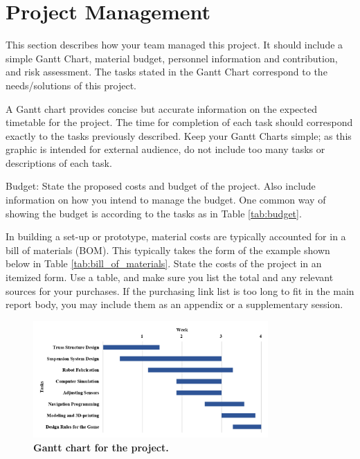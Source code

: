 \documentclass{engr1000j-s2}
\begin{document}
  \hspace{1em}

  \section{Project Management}

  This section describes how your team managed this project. It should include a
  simple Gantt Chart, material budget, personnel information and contribution,
  and risk assessment. The tasks stated in the Gantt Chart correspond to the needs/solutions
  of this project.

  A Gantt chart provides concise but accurate information on the expected timetable
  for the project. The time for completion of each task should correspond
  exactly to the tasks previously described. Keep your Gantt Charts simple; as
  this graphic is intended for external audience, do not include too many tasks or
  descriptions of each task.

  Budget: State the proposed costs and budget of the project. Also include information
  on how you intend to manage the budget. One common way of showing the budget
  is according to the tasks as in Table \ref{tab:budget}.

  In building a set-up or prototype, material costs are typically accounted for in
  a bill of materials (BOM). This typically takes the form of the example shown
  below in Table \ref{tab:bill_of_materials}. State the costs of the project in an
  itemized form. Use a table, and make sure you list the total and any relevant sources
  for your purchases. If the purchasing link list is too long to fit in the main
  report body, you may include them as an appendix or a supplementary session.

  \begin{figure}[H]
    \centering
    \includegraphics[width=0.8\textwidth]{figures/gantt_chart.png}
    \caption{\quad \textbf{Gantt chart for the project.}}
    \label{fig:gantt_chart}
  \end{figure}
\end{document}
